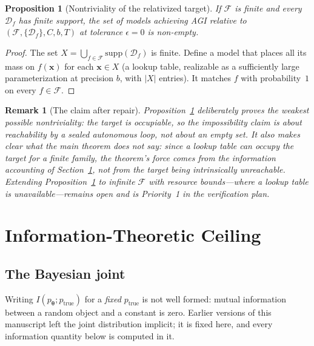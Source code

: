 \documentclass[11pt,a4paper]{article}
\newtheorem{proposition}[theorem]{Proposition}
\newtheorem{remark}[theorem]{Remark}
\begin{document}
\begin{proposition}[Nontriviality of the relativized target]
\label{prop:nontrivial}
If $\mathcal{F}$ is finite and every $\mathcal{D}_f$ has finite support, the set of models achieving AGI relative to $(\mathcal{F},\{\mathcal{D}_f\}, C, b, T)$ at tolerance $\epsilon = 0$ is non-empty.
\end{proposition}

\begin{proof}
The set $X = \bigcup_{f \in \mathcal{F}} \mathrm{supp}(\mathcal{D}_f)$ is finite. Define a model that places all its mass on $f(\bm{x})$ for each $\bm{x} \in X$ (a lookup table, realizable as a sufficiently large parameterization at precision $b$, with $|X|$ entries). It matches $f$ with probability~$1$ on every $f \in \mathcal{F}$.
\end{proof}

\begin{remark}[The claim after repair]
\label{rem:agi_repair}
Proposition~\ref{prop:nontrivial} deliberately proves the weakest possible nontriviality: the target is \emph{occupiable}, so the impossibility claim is about \emph{reachability by a sealed autonomous loop}, not about an empty set. It also makes clear what the main theorem does not say: since a lookup table can occupy the target for a finite family, the theorem's force comes from the information accounting of Section~\ref{sec:info}, not from the target being intrinsically unreachable. Extending Proposition~\ref{prop:nontrivial} to infinite $\mathcal{F}$ with resource bounds---where a lookup table is unavailable---remains open and is Priority~1 in the verification plan.
\end{remark}

\section{Information-Theoretic Ceiling}
\label{sec:info}

\subsection{The Bayesian joint}
\label{sec:joint}

Writing $I(p_{\bm{\theta}}; p_{\mathrm{true}})$ for a \emph{fixed} $p_{\mathrm{true}}$ is not well formed: mutual information between a random object and a constant is zero. Earlier versions of this manuscript left the joint distribution implicit; it is fixed here, and every information quantity below is computed in it.
\end{document}
